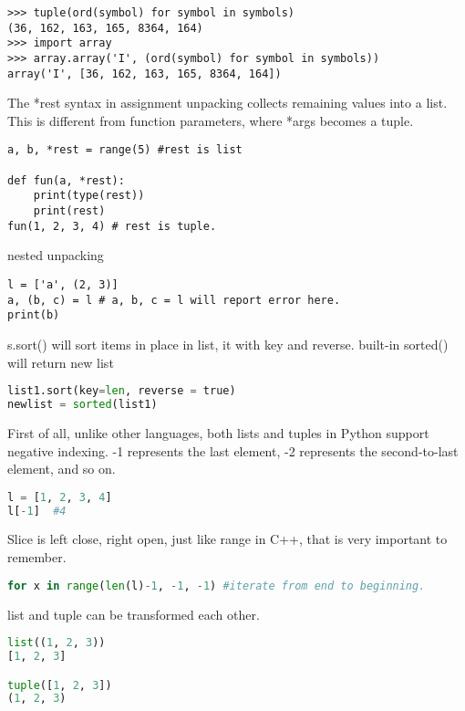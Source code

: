 \documentclass[a4paper,12pt,twoside]{book}
\begin{document}
\begin{lstlisting}
>>> tuple(ord(symbol) for symbol in symbols)
(36, 162, 163, 165, 8364, 164)
>>> import array
>>> array.array('I', (ord(symbol) for symbol in symbols))
array('I', [36, 162, 163, 165, 8364, 164])
\end{lstlisting}

The *rest syntax in assignment unpacking collects remaining values into a list.  This is different from function parameters, where *args becomes a tuple.

\begin{lstlisting}
a, b, *rest = range(5) #rest is list

def fun(a, *rest):
	print(type(rest))
	print(rest)
fun(1, 2, 3, 4) # rest is tuple. 
\end{lstlisting}

nested unpacking

\begin{lstlisting}
l = ['a', (2, 3)]
a, (b, c) = l # a, b, c = l will report error here.
print(b)
\end{lstlisting}

	s.sort() will sort items in place in list, it with key and reverse. built-in sorted() will return new list
\begin{lstlisting}[frame=single, language=Python]
list1.sort(key=len, reverse = true)
newlist = sorted(list1)
\end{lstlisting}  


First of all, unlike other languages, both lists and tuples in Python support negative indexing. -1 represents the last element, -2 represents the second-to-last element, and so on.

\begin{lstlisting}[frame=single, language=Python]
l = [1, 2, 3, 4]
l[-1]  #4
\end{lstlisting}  

Slice is left close, right open, just like range in C++, that is very important to remember.
\begin{lstlisting}[frame=single, language=Python]
for x in range(len(l)-1, -1, -1) #iterate from end to beginning.
\end{lstlisting}  

list and tuple can be transformed each other.
\begin{lstlisting}[frame=single, language=Python]
list((1, 2, 3))
[1, 2, 3]

tuple([1, 2, 3])
(1, 2, 3)
\end{lstlisting}  
\end{document}
